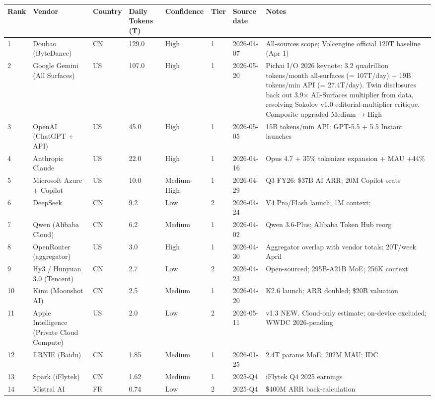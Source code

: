 \documentclass[11pt,a4paper]{article}
\begin{document}
\begin{center}
\begin{tabular}{llllllll}
\toprule
Rank & Vendor & Country & Daily Tokens (T) & Confidence & Tier & Source date & Notes \\
\midrule
1 & Doubao (ByteDance) & CN & 129.0 & High & 1 & 2026-04-07 & All-sources scope; Volcengine official 120T baseline (Apr 1) \\
2 & Google Gemini (All Surfaces) & US & 107.0 & High & 1 & 2026-05-20 & Pichai I/O 2026 keynote: 3.2 quadrillion tokens/month all-surfaces (= 107T/day) + 19B tokens/min API (= 27.4T/day). Twin disclosures back out 3.9× All-Surfaces multiplier from data, resolving Sokolov v1.0 editorial-multiplier critique. Composite upgraded Medium → High \cite{pichai2026io} \\
3 & OpenAI (ChatGPT + API) & US & 45.0 & High & 1 & 2026-05-05 & 15B tokens/min API; GPT-5.5 + 5.5 Instant launches \\
4 & Anthropic Claude & US & 22.0 & High & 1 & 2026-04-16 & Opus 4.7 + 35\% tokenizer expansion + MAU +44\% \\
5 & Microsoft Azure + Copilot & US & 10.0 & Medium-High & 1 & 2026-04-29 & Q3 FY26: \$37B AI ARR; 20M Copilot seats \\
6 & DeepSeek & CN & 9.2 & Low & 2 & 2026-04-24 & V4 Pro/Flash launch; 1M context; #3 enterprise SDK \\
7 & Qwen (Alibaba Cloud) & CN & 6.2 & Medium & 1 & 2026-04-02 & Qwen 3.6-Plus; Alibaba Token Hub reorg \\
8 & OpenRouter (aggregator) & US & 3.0 & High & 1 & 2026-04-30 & Aggregator overlap with vendor totals; 20T/week April \\
9 & Hy3 / Hunyuan 3.0 (Tencent) & CN & 2.7 & Low & 2 & 2026-04-23 & Open-sourced; 295B-A21B MoE; 256K context \\
10 & Kimi (Moonshot AI) & CN & 2.5 & Medium & 1 & 2026-04-20 & K2.6 launch; ARR doubled; \$20B valuation \\
11 & Apple Intelligence (Private Cloud Compute) & US & 2.0 & Low & 2 & 2026-05-11 & v1.3 NEW. Cloud-only estimate; on-device excluded; WWDC 2026-pending \\
12 & ERNIE (Baidu) & CN & 1.85 & Medium & 1 & 2026-01-25 & 2.4T params MoE; 202M MAU; IDC #3 (17\%) \\
13 & Spark (iFlytek) & CN & 1.62 & Medium & 1 & 2025-Q4 & iFlytek Q4 2025 earnings \\
14 & Mistral AI & FR & 0.74 & Low & 2 & 2025-Q4 & \$400M ARR back-calculation \\

\end{tabular}
\end{center}
\end{document}
